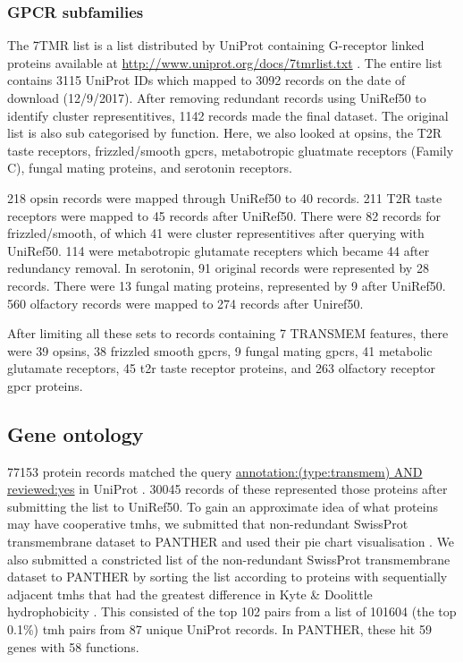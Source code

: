 \subsubsection{GPCR subfamilies}
The 7TMR list is a list distributed by UniProt containing G-receptor linked proteins available at \url{http://www.uniprot.org/docs/7tmrlist.txt} \cite{TheUniProtConsortium2014}.
The entire list contains 3115 UniProt IDs which mapped to 3092 records on the date of download (12/9/2017).
After removing redundant records using UniRef50 to identify cluster representitives, 1142 records made the final dataset.
The original list is also sub categorised by function.
Here, we also looked at opsins, the T2R taste receptors, frizzled/smooth \gls{gpcr}s, metabotropic gluatmate receptors (Family C), fungal mating proteins, and serotonin receptors.

218 opsin records were mapped through UniRef50 to 40 records.
211 T2R taste receptors were mapped to 45 records after UniRef50.
There were 82 records for frizzled/smooth, of which 41 were cluster representitives after querying with UniRef50.
114 were metabotropic glutamate recepters which became 44 after redundancy removal.
In serotonin, 91 original records were represented by 28 records.
There were 13 fungal mating proteins, represented by 9 after UniRef50.
560 olfactory records were mapped to 274 records after Uniref50.

After limiting all these sets to records containing 7 TRANSMEM features, there were 39 opsins, 38 frizzled smooth \gls{gpcr}s, 9 fungal mating \gls{gpcr}s, 41 metabolic glutamate receptors, 45 t2r taste receptor proteins, and 263 olfactory receptor \gls{gpcr} proteins.


\subsection{Gene ontology}
77153 protein records matched the query \url{annotation:(type:transmem) AND reviewed:yes} in UniProt \cite{TheUniProtConsortium2014}.
30045 records of these represented those proteins after submitting the list to UniRef50.
To gain an approximate idea of what proteins may have cooperative \gls{tmh}s, we submitted that non-redundant SwissProt transmembrane dataset to PANTHER and used their pie chart visualisation \cite{Mi2017}.
We also submitted a constricted list of the non-redundant SwissProt transmembrane dataset to PANTHER by sorting the list according to proteins with sequentially adjacent \gls{tmh}s that had the greatest difference in Kyte \& Doolittle hydrophobicity \cite{Kyte1982}.
This consisted of the top 102 pairs from a list of 101604 (the top 0.1\%) \gls{tmh} pairs from 87 unique UniProt records.
In PANTHER, these hit 59 genes with 58 functions.

